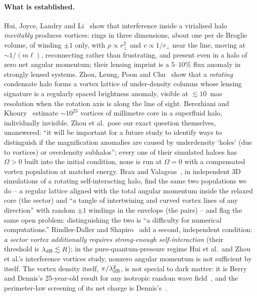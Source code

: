 \documentclass[11pt,a4paper]{article}
\begin{document}
\paragraph{What is established.} Hui, Joyce, Landry and Li~\cite{HuiJoyceLandryLi2020} show that interference
inside a virialised halo \emph{inevitably} produces vortices: rings in three dimensions, about one per de Broglie
volume, of winding $\pm1$ only, with $\rho\propto r_\perp^2$ and $v\propto1/r_\perp$ near the line, moving at
$\sim1/(m\ell)$, reconnecting rather than frustrating, and present even in a halo of zero net angular momentum;
their lensing imprint is a $5$--$10\%$ flux anomaly in strongly lensed systems. Zhou, Leung, Poon and
Chu~\cite{ZhouLeungPoonChu2025} show that a \emph{rotating} condensate halo forms a vortex lattice of
under-density columns whose lensing signature is a regularly spaced brightness anomaly, visible at
$\lesssim10$~mas resolution when the rotation axis is along the line of sight. Berezhiani and
Khoury~\cite{BerezhianiKhoury2015} estimate $\sim10^{23}$ vortices of millimetre core in a superfluid halo,
individually invisible. Zhou et al.\ pose our exact question themselves, unanswered: ``it will be important for
a future study to identify ways to distinguish if the magnification anomalies are caused by underdensity `holes'
(due to vortices) or overdensity subhalos''; every one of their simulated haloes has $\Omega>0$ built into the
initial condition, none is run at $\Omega=0$ with a compensated vortex population at matched energy. Brax and
Valageas~\cite{BraxValageas2025}, in independent 3D simulations of a rotating self-interacting halo, find the
same two populations we do -- a regular lattice aligned with the total angular momentum inside the relaxed core
(the sector) and ``a tangle of intertwining and curved vortex lines of any direction'' with random $\pm1$
windings in the envelope (the pairs) -- and flag the same open problem: distinguishing the two is ``a difficulty
for numerical computations.'' Rindler-Daller and Shapiro~\cite{RindlerDallerShapiro2012} add a second, independent
condition: \emph{a sector vortex additionally requires strong-enough self-interaction} (their threshold is
$\lambda_{\rm dB}\lesssim R$); in the pure-quantum-pressure regime Hui et al.\ and Zhou et al.'s interference
vortices study, nonzero angular momentum is not sufficient by itself. The vortex density itself,
$\pi/\lambda_{\rm dB}^2$, is not special to dark matter: it is Berry and Dennis's 25-year-old result for any
isotropic random wave field~\cite{BerryDennis2000}, and the perimeter-law screening of its net charge is
Dennis's~\cite{Dennis2003}.
\end{document}
